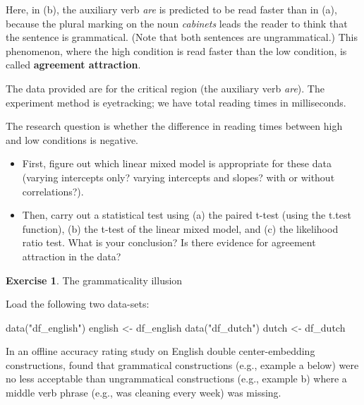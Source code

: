 \documentclass[
  12pt,
]{krantz}
\newenvironment{Shaded}{\begin{snugshade}}{\end{snugshade}}
\newcommand{\FunctionTok}[1]{\textcolor[rgb]{0.00,0.00,0.00}{#1}}
\newcommand{\NormalTok}[1]{#1}
\newcommand{\OtherTok}[1]{\textcolor[rgb]{0.56,0.35,0.01}{#1}}
\newcommand{\StringTok}[1]{\textcolor[rgb]{0.31,0.60,0.02}{#1}}
\providecommand{\tightlist}{%
  \setlength{\itemsep}{0pt}\setlength{\parskip}{0pt}}
\theoremstyle{definition}
\theoremstyle{definition}
\theoremstyle{definition}
\newtheorem{exercise}{Exercise}[chapter]
\theoremstyle{definition}
\theoremstyle{remark}
\begin{document}
Here, in (b), the auxiliary verb \emph{are} is predicted to be read faster than in (a), because the plural marking on the noun \emph{cabinets} leads the reader to think that the sentence is grammatical. (Note that both sentences are ungrammatical.) This phenomenon, where the high condition is read faster than the low condition, is called \textbf{agreement attraction}.

The data provided are for the critical region (the auxiliary verb \emph{are}). The experiment method is eyetracking; we have total reading times in milliseconds.

The research question is whether the difference in reading times between high and low conditions is negative.

\begin{itemize}
\tightlist
\item
  First, figure out which linear mixed model is appropriate for these data (varying intercepts only? varying intercepts and slopes? with or without correlations?).
\item
  Then, carry out a statistical test using (a) the paired t-test (using the t.test function), (b) the t-test of the linear mixed model, and (c) the likelihood ratio test. What is your conclusion? Is there evidence for agreement attraction in the data?
\end{itemize}

\begin{exercise}
\protect\hypertarget{exr:HypTestExerciseGramCE}{}\label{exr:HypTestExerciseGramCE}The grammaticality illusion
\end{exercise}

Load the following two data-sets:

\begin{Shaded}
\begin{Highlighting}[]
\FunctionTok{data}\NormalTok{(}\StringTok{"df\_english"}\NormalTok{)}
\NormalTok{english }\OtherTok{\textless{}{-}}\NormalTok{ df\_english}
\FunctionTok{data}\NormalTok{(}\StringTok{"df\_dutch"}\NormalTok{)}
\NormalTok{dutch }\OtherTok{\textless{}{-}}\NormalTok{ df\_dutch}
\end{Highlighting}
\end{Shaded}

In an offline accuracy rating study on English double center-embedding constructions, \citet{gibsonthomas99} found that grammatical constructions (e.g., example a below) were no less acceptable than ungrammatical constructions (e.g., example b) where a middle verb phrase (e.g., was cleaning every week) was missing.
\end{document}
